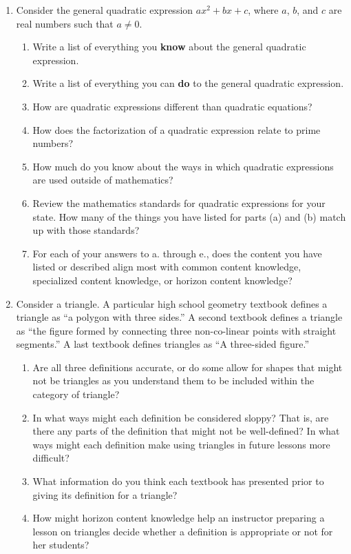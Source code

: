 \documentclass[
]{book}
\theoremstyle{definition}
\theoremstyle{definition}
\theoremstyle{definition}
\theoremstyle{definition}
\theoremstyle{remark}
\begin{document}
\begin{enumerate}
\def\labelenumi{\arabic{enumi}.}
\item
  Consider the general quadratic expression \(ax^2 + bx+c\), where \(a\), \(b\), and \(c\) are real numbers such that \(a\neq0\).

  \begin{enumerate}
  \def\labelenumii{\alph{enumii}.}
  \item
    Write a list of everything you \textbf{know} about the general quadratic expression.
  \item
    Write a list of everything you can \textbf{do} to the general quadratic expression.
  \item
    How are quadratic expressions different than quadratic equations?
  \item
    How does the factorization of a quadratic expression relate to prime numbers?
  \item
    How much do you know about the ways in which quadratic expressions are used outside of mathematics?
  \item
    Review the mathematics standards for quadratic expressions for your state. How many of the things you have listed for parts (a) and (b) match up with those standards?
  \item
    For each of your answers to a. through e., does the content you have listed or described align most with common content knowledge, specialized content knowledge, or horizon content knowledge?
  \end{enumerate}
\item
  Consider a triangle. A particular high school geometry textbook defines a triangle as ``a polygon with three sides.'' A second textbook defines a triangle as ``the figure formed by connecting three non-co-linear points with straight segments.'' A last textbook defines triangles as ``A three-sided figure.''

  \begin{enumerate}
  \def\labelenumii{\alph{enumii})}
  \item
    Are all three definitions accurate, or do some allow for shapes that might not be triangles as you understand them to be included within the category of triangle?
  \item
    In what ways might each definition be considered sloppy? That is, are there any parts of the definition that might not be well-defined? In what ways might each definition make using triangles in future lessons more difficult?
  \item
    What information do you think each textbook has presented prior to giving its definition for a triangle?
  \item
    How might horizon content knowledge help an instructor preparing a lesson on triangles decide whether a definition is appropriate or not for her students?
  \end{enumerate}
\end{enumerate}
\end{document}
